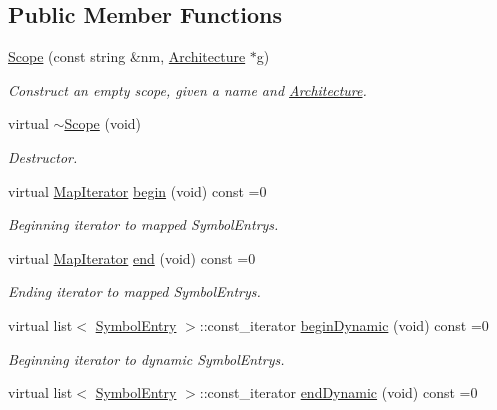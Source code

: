 \subsection*{Public Member Functions}
\begin{DoxyCompactItemize}
\item 
\mbox{\hyperlink{class_scope_a203cfd8813735894486ed2c57f378f1e}{Scope}} (const string \&nm, \mbox{\hyperlink{class_architecture}{Architecture}} $\ast$g)
\begin{DoxyCompactList}\small\item\em Construct an empty scope, given a name and \mbox{\hyperlink{class_architecture}{Architecture}}. \end{DoxyCompactList}\item 
virtual \mbox{\hyperlink{class_scope_a571dad0bea947a7c5c1cfea083733963}{$\sim$\+Scope}} (void)
\begin{DoxyCompactList}\small\item\em Destructor. \end{DoxyCompactList}\item 
virtual \mbox{\hyperlink{class_map_iterator}{Map\+Iterator}} \mbox{\hyperlink{class_scope_a054e7b7c470035be94e1e4229ff188d4}{begin}} (void) const =0
\begin{DoxyCompactList}\small\item\em Beginning iterator to mapped Symbol\+Entrys. \end{DoxyCompactList}\item 
virtual \mbox{\hyperlink{class_map_iterator}{Map\+Iterator}} \mbox{\hyperlink{class_scope_a186b8c11ebef0f2d3838bfe1e46b6db6}{end}} (void) const =0
\begin{DoxyCompactList}\small\item\em Ending iterator to mapped Symbol\+Entrys. \end{DoxyCompactList}\item 
virtual list$<$ \mbox{\hyperlink{class_symbol_entry}{Symbol\+Entry}} $>$\+::const\+\_\+iterator \mbox{\hyperlink{class_scope_aab0f92c9d85a20b77b562e5a499b9e6d}{begin\+Dynamic}} (void) const =0
\begin{DoxyCompactList}\small\item\em Beginning iterator to dynamic Symbol\+Entrys. \end{DoxyCompactList}\item 
virtual list$<$ \mbox{\hyperlink{class_symbol_entry}{Symbol\+Entry}} $>$\+::const\+\_\+iterator \mbox{\hyperlink{class_scope_add98c4a0c13d3497f82d0a5c2353b578}{end\+Dynamic}} (void) const =0

\end{DoxyCompactItemize}
